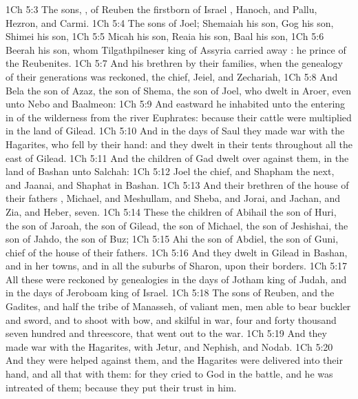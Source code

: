 \vs 1Ch 5:3 The sons, , of Reuben the firstborn of Israel , Hanoch, and Pallu, Hezron, and Carmi.
\vs 1Ch 5:4 The sons of Joel; Shemaiah his son, Gog his son, Shimei his son,
\vs 1Ch 5:5 Micah his son, Reaia his son, Baal his son,
\vs 1Ch 5:6 Beerah his son, whom Tilgathpilneser king of Assyria carried away : he  prince of the Reubenites.
\vs 1Ch 5:7 And his brethren by their families, when the genealogy of their generations was reckoned,  the chief, Jeiel, and Zechariah,
\vs 1Ch 5:8 And Bela the son of Azaz, the son of Shema, the son of Joel, who dwelt in Aroer, even unto Nebo and Baalmeon:
\vs 1Ch 5:9 And eastward he inhabited unto the entering in of the wilderness from the river Euphrates: because their cattle were multiplied in the land of Gilead.
\vs 1Ch 5:10 And in the days of Saul they made war with the Hagarites, who fell by their hand: and they dwelt in their tents throughout all the east  of Gilead.
\vs 1Ch 5:11 And the children of Gad dwelt over against them, in the land of Bashan unto Salchah:
\vs 1Ch 5:12 Joel the chief, and Shapham the next, and Jaanai, and Shaphat in Bashan.
\vs 1Ch 5:13 And their brethren of the house of their fathers , Michael, and Meshullam, and Sheba, and Jorai, and Jachan, and Zia, and Heber, seven.
\vs 1Ch 5:14 These  the children of Abihail the son of Huri, the son of Jaroah, the son of Gilead, the son of Michael, the son of Jeshishai, the son of Jahdo, the son of Buz;
\vs 1Ch 5:15 Ahi the son of Abdiel, the son of Guni, chief of the house of their fathers.
\vs 1Ch 5:16 And they dwelt in Gilead in Bashan, and in her towns, and in all the suburbs of Sharon, upon their borders.
\vs 1Ch 5:17 All these were reckoned by genealogies in the days of Jotham king of Judah, and in the days of Jeroboam king of Israel.
\vs 1Ch 5:18 The sons of Reuben, and the Gadites, and half the tribe of Manasseh, of valiant men, men able to bear buckler and sword, and to shoot with bow, and skilful in war,  four and forty thousand seven hundred and threescore, that went out to the war.
\vs 1Ch 5:19 And they made war with the Hagarites, with Jetur, and Nephish, and Nodab.
\vs 1Ch 5:20 And they were helped against them, and the Hagarites were delivered into their hand, and all that  with them: for they cried to God in the battle, and he was intreated of them; because they put their trust in him.
